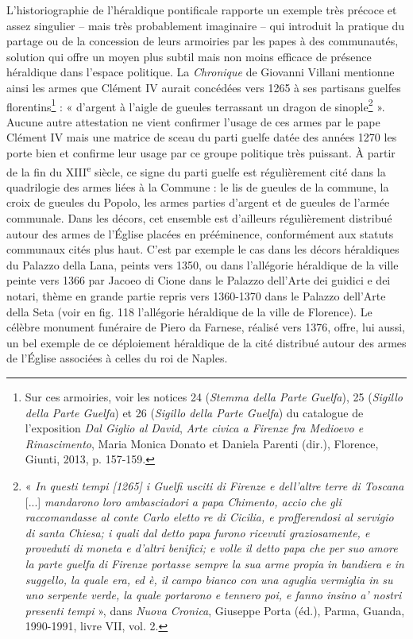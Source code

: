 \documentclass[12pt,twoside,openany]{book}
\begin{document}
L’historiographie de l’héraldique pontificale rapporte un exemple très précoce et assez singulier – mais très probablement imaginaire – qui introduit la pratique du partage ou de la concession de leurs armoiries par les papes à des communautés, solution qui offre un moyen plus subtil mais non moins efficace de présence héraldique dans l’espace politique. La \textit{Chronique} de Giovanni Villani mentionne ainsi les armes que Clément IV aurait concédées vers 1265 à ses partisans guelfes florentins\footnote{Sur ces armoiries, voir les notices 24 (\textit{Stemma della Parte Guelfa}), 25 (\textit{Sigillo della Parte Guelfa}) et 26 (\textit{Sigillo della Parte Guelfa}) du catalogue de l’exposition \textit{Dal Giglio al David}, \textit{Arte civica a Firenze fra Medioevo e Rinascimento}, Maria Monica Donato et Daniela Parenti (dir.), Florence, Giunti, 2013, p. 157-159.} : « d’argent à l’aigle de gueules terrassant un dragon de sinople\footnote{« \textit{In questi tempi [1265] i Guelfi usciti di Firenze e dell’altre terre di Toscana }[...]\textit{ mandarono loro ambasciadori a papa Chimento, accio che gli raccomandasse al conte Carlo eletto re di Cicilia, e profferendosi al servigio di santa Chiesa; i quali dal detto papa furono ricevuti graziosamente, e proveduti di moneta e d’altri benifici; e volle il detto papa che per suo amore la parte guelfa di Firenze portasse sempre la sua arme propia in bandiera e in suggello, la quale era, ed è, il campo bianco con una aguglia vermiglia in su uno serpente verde, la quale portarono e tennero poi, e fanno insino a’ nostri presenti tempi} », dans \textit{Nuova Cronica}, Giuseppe Porta (éd.), Parma, Guanda, 1990-1991, livre VII, vol. 2.} ». Aucune autre attestation ne vient confirmer l’usage de ces armes par le pape Clément IV mais une matrice de sceau du parti guelfe datée des années 1270 les porte bien et confirme leur usage par ce groupe politique très puissant. À partir de la fin du XIII\textsuperscript{e} siècle, ce signe du parti guelfe est régulièrement cité dans la quadrilogie des armes liées à la Commune : le lis de gueules de la commune, la croix de gueules du Popolo, les armes parties d’argent et de gueules de l’armée communale. Dans les décors, cet ensemble est d’ailleurs régulièrement distribué autour des armes de l’Église placées en prééminence, conformément aux statuts communaux cités plus haut. C’est par exemple le cas dans les décors héraldiques du Palazzo della Lana, peints vers 1350, ou dans l’allégorie héraldique de la ville peinte vers 1366 par Jacoeo di Cione dans le Palazzo dell’Arte dei guidici e dei notari, thème en grande partie repris vers 1360-1370 dans le Palazzo dell’Arte della Seta (voir en fig. 118 l’allégorie héraldique de la ville de Florence). Le célèbre monument funéraire de Piero da Farnese, réalisé vers 1376, offre, lui aussi, un bel exemple de ce déploiement héraldique de la cité distribué autour des armes de l’Église associées à celles du roi de Naples.
\end{document}
